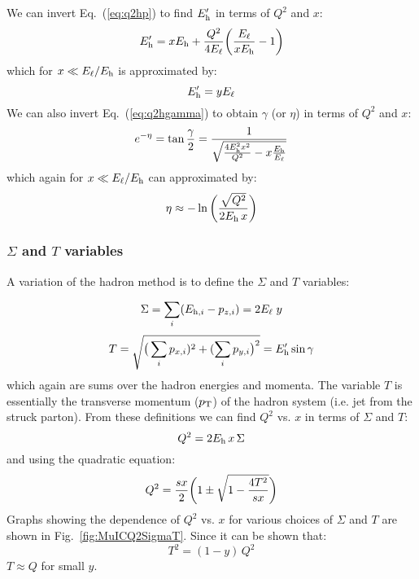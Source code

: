 \documentclass[12pt]{article}
\begin{document}
We can invert Eq.~(\ref{eq:q2hp}) to find $E^\prime_{\rm h}$ in terms of $Q^2$ and $x$:
%
\begin{equation}
E^\prime_{\rm h}  = xE_{\rm h} + {Q^2 \over 4 E_\ell}\bigg({E_\ell \over x E_{\rm h}} - 1 \bigg)
\label{eq:hp}
\end{equation}
%
which for $x \ll E_\ell/E_{\rm h}$ is approximated by:
%
\begin{equation}
E^\prime_{\rm h}  = yE_\ell 
\end{equation}
%
We can also invert Eq.~(\ref{eq:q2hgamma}) to obtain $\gamma$ (or $\eta$) in terms of $Q^2$ and $x$:
%
\begin{equation}
e^{-\eta} = \tan {\gamma \over 2}   = { 1 \over \sqrt{{4E_{\rm h}^2 x^2 \over Q^2} - x {E_{\rm h} \over E_\ell} }  }  
\label{eq:gamma}
\end{equation}
%
which again for $x \ll E_\ell/E_{\rm h}$ can approximated by:
%
\begin{equation}
\eta \approx -\ln \bigg( {\sqrt{Q^2} \over 2 E_{\rm h}\, x } \bigg)
\end{equation}
%

\subsubsection{$\Sigma$ and $T$ variables}

A variation of the hadron method is to define the $\Sigma$ and $T$
variables:

\begin{equation}
\Sigma = \sum_i (E_{{\rm h},i}-p_{z,i}) =  2 E_\ell\; y
  \label{eq:sigma}
\end{equation}
%
\begin{equation}
T = \sqrt{  \big(\sum_i p_{x,i})^2 + (\sum_i p_{y,i} \big)^2  } = E^\prime_{\rm h} \sin\gamma
  \label{eq:T}
\end{equation}
%
which again are sums over the  hadron energies and momenta. The
variable $T$ is essentially the transverse momentum ($p_{\rm T}$) of
the hadron system (i.e. jet from the struck parton). From these definitions
we can find $Q^2$ vs. $x$ in terms of $\Sigma$ and $T$:
%
\begin{equation}
Q^2 = 2 E_{\rm h} \, x\, \Sigma
  \label{eq:Q2Sigma}
\end{equation}
%
and using the quadratic equation:
%
\begin{equation}
Q^2 = {s x \over 2} \bigg(1 \pm \sqrt{1-{4T^2\over sx}}  \bigg)
  \label{eq:Q2T}
\end{equation}
%
Graphs showing the dependence of $Q^2$ vs. $x$ for various choices of
$\Sigma$ and $T$ are shown in Fig.~\ref{fig:MuICQ2SigmaT}.
Since it can be shown that:
%
\begin{equation}
T^2 =  (1-y)\,Q^2 
\end{equation}
%
$T \approx Q$ for small $y$.
\end{document}
